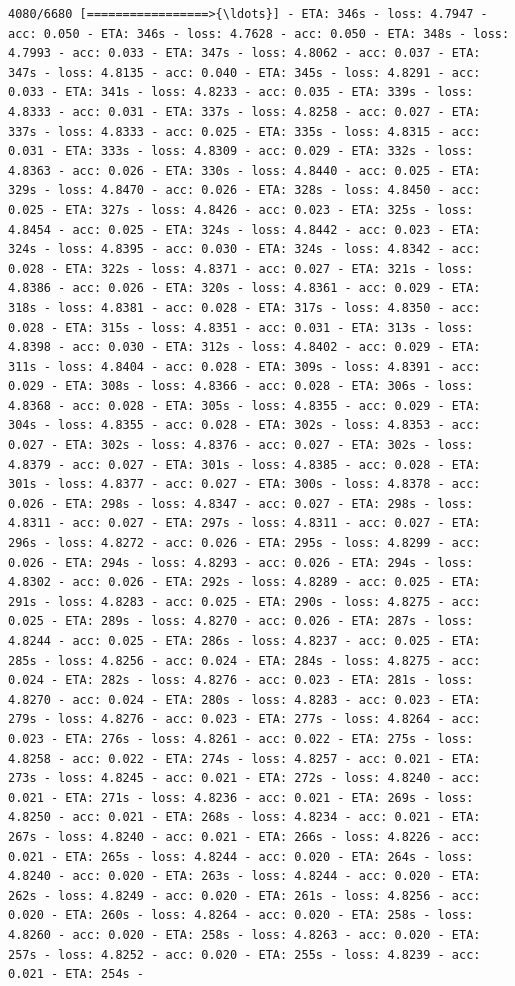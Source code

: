 \documentclass[11pt]{article}
\begin{document}
\begin{Verbatim}[commandchars=\\\{\}]
4080/6680 [=================>{\ldots}] - ETA: 346s - loss: 4.7947 - acc: 0.050 - ETA: 346s - loss: 4.7628 - acc: 0.050 - ETA: 348s - loss: 4.7993 - acc: 0.033 - ETA: 347s - loss: 4.8062 - acc: 0.037 - ETA: 347s - loss: 4.8135 - acc: 0.040 - ETA: 345s - loss: 4.8291 - acc: 0.033 - ETA: 341s - loss: 4.8233 - acc: 0.035 - ETA: 339s - loss: 4.8333 - acc: 0.031 - ETA: 337s - loss: 4.8258 - acc: 0.027 - ETA: 337s - loss: 4.8333 - acc: 0.025 - ETA: 335s - loss: 4.8315 - acc: 0.031 - ETA: 333s - loss: 4.8309 - acc: 0.029 - ETA: 332s - loss: 4.8363 - acc: 0.026 - ETA: 330s - loss: 4.8440 - acc: 0.025 - ETA: 329s - loss: 4.8470 - acc: 0.026 - ETA: 328s - loss: 4.8450 - acc: 0.025 - ETA: 327s - loss: 4.8426 - acc: 0.023 - ETA: 325s - loss: 4.8454 - acc: 0.025 - ETA: 324s - loss: 4.8442 - acc: 0.023 - ETA: 324s - loss: 4.8395 - acc: 0.030 - ETA: 324s - loss: 4.8342 - acc: 0.028 - ETA: 322s - loss: 4.8371 - acc: 0.027 - ETA: 321s - loss: 4.8386 - acc: 0.026 - ETA: 320s - loss: 4.8361 - acc: 0.029 - ETA: 318s - loss: 4.8381 - acc: 0.028 - ETA: 317s - loss: 4.8350 - acc: 0.028 - ETA: 315s - loss: 4.8351 - acc: 0.031 - ETA: 313s - loss: 4.8398 - acc: 0.030 - ETA: 312s - loss: 4.8402 - acc: 0.029 - ETA: 311s - loss: 4.8404 - acc: 0.028 - ETA: 309s - loss: 4.8391 - acc: 0.029 - ETA: 308s - loss: 4.8366 - acc: 0.028 - ETA: 306s - loss: 4.8368 - acc: 0.028 - ETA: 305s - loss: 4.8355 - acc: 0.029 - ETA: 304s - loss: 4.8355 - acc: 0.028 - ETA: 302s - loss: 4.8353 - acc: 0.027 - ETA: 302s - loss: 4.8376 - acc: 0.027 - ETA: 302s - loss: 4.8379 - acc: 0.027 - ETA: 301s - loss: 4.8385 - acc: 0.028 - ETA: 301s - loss: 4.8377 - acc: 0.027 - ETA: 300s - loss: 4.8378 - acc: 0.026 - ETA: 298s - loss: 4.8347 - acc: 0.027 - ETA: 298s - loss: 4.8311 - acc: 0.027 - ETA: 297s - loss: 4.8311 - acc: 0.027 - ETA: 296s - loss: 4.8272 - acc: 0.026 - ETA: 295s - loss: 4.8299 - acc: 0.026 - ETA: 294s - loss: 4.8293 - acc: 0.026 - ETA: 294s - loss: 4.8302 - acc: 0.026 - ETA: 292s - loss: 4.8289 - acc: 0.025 - ETA: 291s - loss: 4.8283 - acc: 0.025 - ETA: 290s - loss: 4.8275 - acc: 0.025 - ETA: 289s - loss: 4.8270 - acc: 0.026 - ETA: 287s - loss: 4.8244 - acc: 0.025 - ETA: 286s - loss: 4.8237 - acc: 0.025 - ETA: 285s - loss: 4.8256 - acc: 0.024 - ETA: 284s - loss: 4.8275 - acc: 0.024 - ETA: 282s - loss: 4.8276 - acc: 0.023 - ETA: 281s - loss: 4.8270 - acc: 0.024 - ETA: 280s - loss: 4.8283 - acc: 0.023 - ETA: 279s - loss: 4.8276 - acc: 0.023 - ETA: 277s - loss: 4.8264 - acc: 0.023 - ETA: 276s - loss: 4.8261 - acc: 0.022 - ETA: 275s - loss: 4.8258 - acc: 0.022 - ETA: 274s - loss: 4.8257 - acc: 0.021 - ETA: 273s - loss: 4.8245 - acc: 0.021 - ETA: 272s - loss: 4.8240 - acc: 0.021 - ETA: 271s - loss: 4.8236 - acc: 0.021 - ETA: 269s - loss: 4.8250 - acc: 0.021 - ETA: 268s - loss: 4.8234 - acc: 0.021 - ETA: 267s - loss: 4.8240 - acc: 0.021 - ETA: 266s - loss: 4.8226 - acc: 0.021 - ETA: 265s - loss: 4.8244 - acc: 0.020 - ETA: 264s - loss: 4.8240 - acc: 0.020 - ETA: 263s - loss: 4.8244 - acc: 0.020 - ETA: 262s - loss: 4.8249 - acc: 0.020 - ETA: 261s - loss: 4.8256 - acc: 0.020 - ETA: 260s - loss: 4.8264 - acc: 0.020 - ETA: 258s - loss: 4.8260 - acc: 0.020 - ETA: 258s - loss: 4.8263 - acc: 0.020 - ETA: 257s - loss: 4.8252 - acc: 0.020 - ETA: 255s - loss: 4.8239 - acc: 0.021 - ETA: 254s - 
\end{Verbatim}
\end{document}
